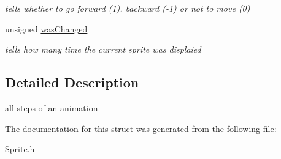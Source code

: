 \begin{DoxyCompactItemize}
\begin{DoxyCompactList}\small\item\em tells whether to go forward (1), backward (-\/1) or not to move (0) \end{DoxyCompactList}\item 
unsigned \hyperlink{structListSprite_acb741e12837c8bf6499506f30ca46477}{was\+Changed}\hypertarget{structListSprite_acb741e12837c8bf6499506f30ca46477}{}\label{structListSprite_acb741e12837c8bf6499506f30ca46477}

\begin{DoxyCompactList}\small\item\em tells how many time the current sprite was displaied \end{DoxyCompactList}\end{DoxyCompactItemize}


\subsection{Detailed Description}
all steps of an animation 

The documentation for this struct was generated from the following file\+:\begin{DoxyCompactItemize}
\item 
\hyperlink{Sprite_8h}{Sprite.\+h}\end{DoxyCompactItemize}
